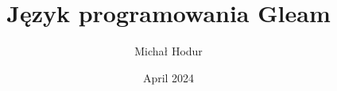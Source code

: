 \documentclass{book}
\begin{document}
\author{Michał Hodur}
\title{Język programowania Gleam}
\date{April 2024}

\frontmatter
\maketitle
\tableofcontents

\mainmatter



\backmatter
\end{document}
